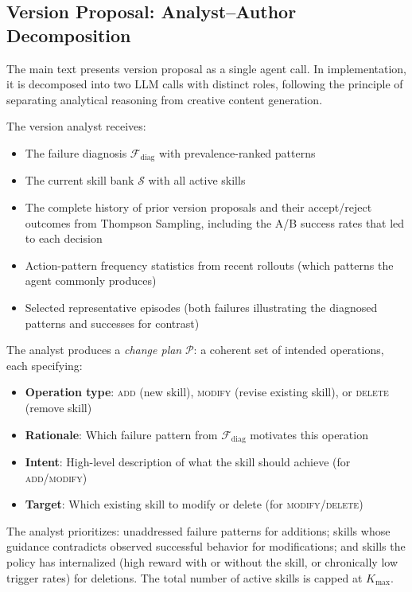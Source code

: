 \documentclass{article}
\theoremstyle{plain}
\theoremstyle{definition}
\theoremstyle{remark}
\begin{document}
\subsection{Version Proposal: Analyst--Author Decomposition}

The main text presents version proposal as a single agent call. In implementation, it is decomposed into two LLM calls with distinct roles, following the principle of separating analytical reasoning from creative content generation.

The version analyst receives:
\begin{itemize}[itemsep=2pt, leftmargin=*]
    \item The failure diagnosis $\mathcal{F}_{\text{diag}}$ with prevalence-ranked patterns
    \item The current skill bank $\mathcal{S}$ with all active skills
    \item The complete history of prior version proposals and their accept/reject outcomes from Thompson Sampling, including the A/B success rates that led to each decision
    \item Action-pattern frequency statistics from recent rollouts (which patterns the agent commonly produces)
    \item Selected representative episodes (both failures illustrating the diagnosed patterns and successes for contrast)
\end{itemize}

The analyst produces a \textit{change plan} $\mathcal{P}$: a coherent set of intended operations, each specifying:
\begin{itemize}[itemsep=2pt, leftmargin=*]
    \item \textbf{Operation type}: \textsc{add} (new skill), \textsc{modify} (revise existing skill), or \textsc{delete} (remove skill)
    \item \textbf{Rationale}: Which failure pattern from $\mathcal{F}_{\text{diag}}$ motivates this operation
    \item \textbf{Intent}: High-level description of what the skill should achieve (for \textsc{add}/\textsc{modify})
    \item \textbf{Target}: Which existing skill to modify or delete (for \textsc{modify}/\textsc{delete})
\end{itemize}

The analyst prioritizes: unaddressed failure patterns for additions; skills whose guidance contradicts observed successful behavior for modifications; and skills the policy has internalized (high reward with or without the skill, or chronically low trigger rates) for deletions. The total number of active skills is capped at $K_{\max}$.
\end{document}
